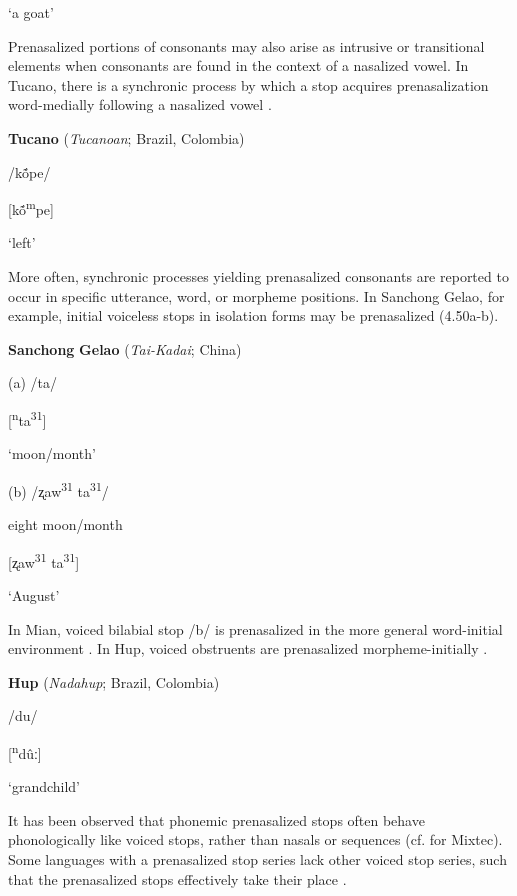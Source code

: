 \glt ‘a goat’

\citep[132]{Tak2011}

\z

  Prenasalized portions of consonants may also arise as intrusive or transitional elements when consonants are found in the context of a nasalized vowel. In Tucano, there is a synchronic process by which a stop acquires prenasalization word-medially following a nasalized vowel .

\ea\label{ex:(4.49)}
  \textbf{Tucano} (\textit{Tucanoan}; Brazil, Colombia)

/kṍpe/

[kṍ\textsuperscript{m}pe]

\glt ‘left’

\citep[11]{West1980}

\z

  More often, synchronic processes yielding prenasalized consonants are reported to occur in specific utterance, word, or morpheme positions. In Sanchong Gelao, for example, initial voiceless stops in isolation forms may be prenasalized (4.50a-b).

\ea\label{ex:(4.50)}
  \textbf{Sanchong} \textbf{Gelao} (\textit{Tai-Kadai}; China)

(a)  /ta/

  [\textsuperscript{n}ta\textsuperscript{31}]

  ‘moon/month’

(b)  /ʐaw\textsuperscript{31}   ta\textsuperscript{31}/

  eight   moon/month

  [ʐaw\textsuperscript{31} ta\textsuperscript{31}]

  ‘August’

\citep[40]{Shen2003}

\z

  In Mian, voiced bilabial stop /b/ is prenasalized in the more general word-initial environment \citep{Fedden2007}. In Hup, voiced obstruents are prenasalized morpheme-initially .

\ea\label{ex:(4.51)}
  \textbf{Hup} (\textit{Nadahup}; Brazil, Colombia)

/du/

[\textsuperscript{n}dûː]

\glt ‘grandchild’

\citep[54]{Epps2008}

\z

  It has been observed that phonemic prenasalized stops often behave phonologically like voiced stops, rather than nasals or sequences (cf. \citealt{IversonSalmons1996} for Mixtec). Some languages with a prenasalized stop series lack other voiced stop series, such that the prenasalized stops effectively take their place \citep[67-8]{Maddieson1984}.

